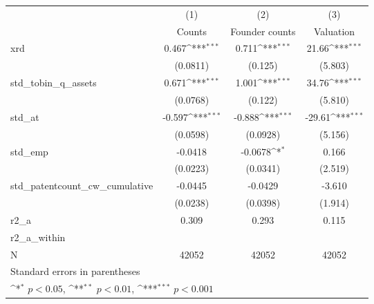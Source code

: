 {
\def\sym#1{\ifmmode^{#1}\else\(^{#1}\)\fi}
\begin{tabular}{l*{3}{c}}
\hline\hline
            &\multicolumn{1}{c}{(1)}&\multicolumn{1}{c}{(2)}&\multicolumn{1}{c}{(3)}\\
            &\multicolumn{1}{c}{Counts}&\multicolumn{1}{c}{Founder counts}&\multicolumn{1}{c}{Valuation}\\
\hline
xrd         &       0.467\sym{***}&       0.711\sym{***}&       21.66\sym{***}\\
            &    (0.0811)         &     (0.125)         &     (5.803)         \\
[1em]
std\_tobin\_q\_assets&       0.671\sym{***}&       1.001\sym{***}&       34.76\sym{***}\\
            &    (0.0768)         &     (0.122)         &     (5.810)         \\
[1em]
std\_at      &      -0.597\sym{***}&      -0.888\sym{***}&      -29.61\sym{***}\\
            &    (0.0598)         &    (0.0928)         &     (5.156)         \\
[1em]
std\_emp     &     -0.0418         &     -0.0678\sym{*}  &       0.166         \\
            &    (0.0223)         &    (0.0341)         &     (2.519)         \\
[1em]
std\_patentcount\_cw\_cumulative&     -0.0445         &     -0.0429         &      -3.610         \\
            &    (0.0238)         &    (0.0398)         &     (1.914)         \\
\hline
r2\_a        &       0.309         &       0.293         &       0.115         \\
r2\_a\_within &                     &                     &                     \\
N           &       42052         &       42052         &       42052         \\
\hline\hline
\multicolumn{4}{l}{\footnotesize Standard errors in parentheses}\\
\multicolumn{4}{l}{\footnotesize \sym{*} \(p<0.05\), \sym{**} \(p<0.01\), \sym{***} \(p<0.001\)}\\
\end{tabular}
}
